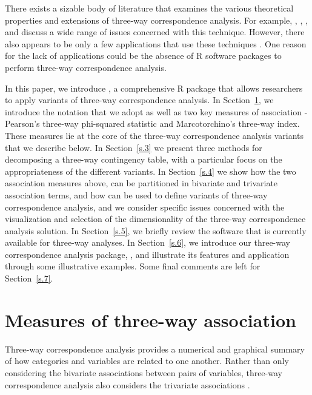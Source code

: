 There exists a sizable body of literature that examines the various theoretical properties and extensions of three-way correspondence analysis. For example, \citet{kro89}, \citet[]{carkro96}, \citet[Chap. 17]{kro08}, \citet[Chap. 11]{behlom14} and \citet{lombehkro21} discuss a wide range of issues concerned with this technique. However, there also appears to be only a few applications that use these techniques \cite[]{carkro98, vel07,lombehgue19}. One reason for the lack of applications could be the absence of R software packages  to perform three-way correspondence analysis. 

In this paper, we introduce , a comprehensive R package that allows researchers to apply variants of three-way correspondence analysis. In Section~\ref{s.2}, we introduce the notation that we adopt as well as two key measures of association - Pearson's three-way phi-squared statistic and Marcotorchino's three-way index. These measures lie at the core of the three-way correspondence analysis variants that we describe below. In Section~\ref{s.3} we present three methods for decomposing a three-way contingency table,  with a particular focus on the appropriateness of the different variants. In Section~\ref{s.4} we show how the two association measures above,  can be partitioned in bivariate and trivariate association terms, and how can be used to define variants of three-way correspondence analysis, and we consider specific issues concerned with the visualization and selection of the dimensionality of the three-way correspondence analysis solution. 
In Section~\ref{s.5}, we briefly review the software that is currently available for three-way analyses. In Section~\ref{s.6}, we introduce our three-way correspondence analysis package, , and illustrate its features and application through some illustrative examples. Some final comments are left for Section~\ref{s.7}.

 


\section{Measures of three-way association}
\label{s.2}


Three-way correspondence analysis provides a numerical and graphical summary of how categories and variables are related to one another. Rather than only considering the bivariate associations between pairs of variables, three-way correspondence analysis also considers the trivariate associations \citep{lombehkro21}.  

